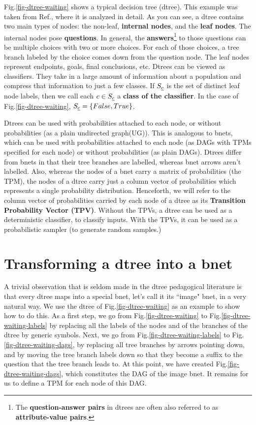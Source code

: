 Fig.\ref{fig-dtree-waiting}
shows a typical decision tree (dtree).
This example was taken
from Ref.\cite{stu-nor-book},
where it is analyzed
in detail.
As you can see,
a dtree contains two main types
of nodes: the non-leaf, 
{\bf internal nodes},
and the {\bf leaf nodes}.
The internal nodes pose 
{\bf questions}. In general,
the {\bf answers}\footnote
{The {\bf question-answer pairs}
in dtrees are often
also referred to as 
{\bf attribute-value pairs}.}
 to those
questions can
be multiple choices with
two or more choices.
For each of those choices,
a tree branch labeled by the choice
 comes down from the 
question node.
The leaf nodes represent 
endpoints, goals, final
conclusions, etc.
Dtrees can be viewed
as classifiers. They
take in a large amount 
of information about a population 
and compress that information
to just a few classes.
If $S_{\underline{c}}$ is the 
set of distinct leaf node labels,
then we call each
$c\in S_{\underline{c}}$
a  {\bf class of the classifier}.
In the case of
Fig.\ref{fig-dtree-waiting},
$S_{\underline{c}}=\{False, True\}$.

Dtrees can be used 
with
probabilities attached to each node, or without
probabilities
(as a
plain undirected graph(UG)).
This is analogous to bnets,
which can be used with
probabilities attached to each node
 (as DAGs with
TPMs specified for each node) or without
probabilities (as plain
DAGs).
Dtrees differ 
from bnets in that
their tree branches 
are labelled, whereas bnet arrows
 aren't labelled.
Also,
whereas the nodes of
a bnet carry a matrix of 
probabilities (the TPM),
the nodes of a dtree carry
just a column vector
of probabilities
which represents
a single 
probability distribution.
Henceforth,
we will refer to
the column vector
of probabilities
carried by each node of a dtree
as its {\bf Transition
Probability Vector (TPV)}.
Without the TPVs,
a dtree can be used 
as a deterministic classifier,
to classify inputs.
With the TPVs,
it can be used as a 
probabilistic sampler (to generate
random samples.)

\section{Transforming a dtree into a bnet}
A trivial 
observation
that is seldom made
in the dtree pedagogical literature
is that every dtree 
maps into a special bnet, 
let's call it
its ``image" bnet,
in a very natural way.
We use the dtree
of Fig.\ref{fig-dtree-waiting}
as an example to show 
how to do this. As 
a first 
step,
we go from
Fig.\ref{fig-dtree-waiting}
to
Fig.\ref{fig-dtree-waiting-labels}
by
replacing
all the labels of the
nodes and of the branches of
the dtree 
by generic symbols. 
Next, we go 
from Fig.\ref{fig-dtree-waiting-labels}
to Fig.\ref{fig-dtree-waiting-dags},
by replacing all tree branches 
by arrows pointing down,
 and by
moving the tree branch labels 
down so that they
become a suffix to the question 
that the tree branch leads to.
At this point,
we have created
Fig.\ref{fig-dtree-waiting-dags},
which constitutes
the DAG of the image bnet.
It remains for us to define
a TPM for each node
of this DAG.

